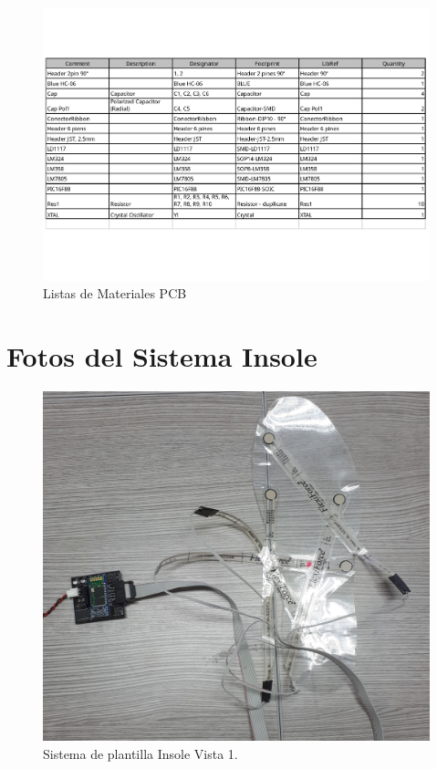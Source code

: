 \begin{figure}[H]
\centering
\includegraphics[width=1\textwidth]{./Documentos_PDF/Lista_Materiales.pdf}
\caption{Listas de Materiales PCB}
\label{fig:Lista_Materiales}
\end{figure}

\newpage

\section{Fotos del Sistema Insole}

\begin{figure}[H]
\centering
\includegraphics[width=1\textwidth]{./image/foto3.jpg}
\caption{Sistema de plantilla Insole Vista 1.}
\label{fig:plantillavista1}
\end{figure}

